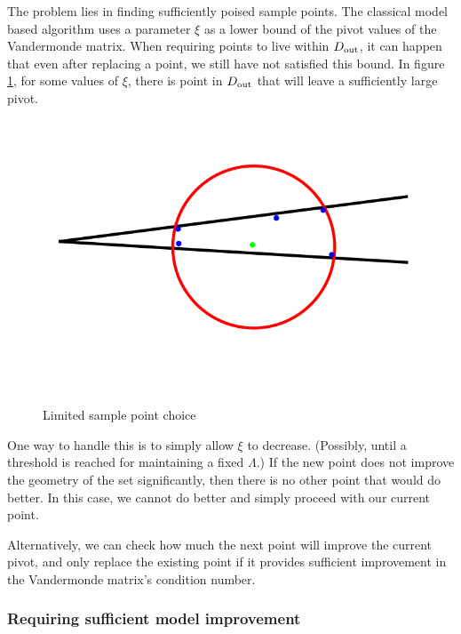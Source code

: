 The problem lies in finding sufficiently poised sample points.
The classical model based algorithm uses a parameter $\xi$ as a lower bound of the pivot values of the Vandermonde matrix.
When requiring points to live within $ D_{\text{out}} $, it can happen that even after replacing a point, we still have not satisfied this bound.
In figure \cref{lspc}, for some values of $\xi$, there is point in $ D_{\text{out}} $ that will leave a sufficiently large pivot.

\begin{figure}[h]
    \centering
    \includegraphics[scale=0.4]{images/bad_lambda.png}
    \caption{Limited sample point choice}
    \label{lspc}
\end{figure}


One way to handle this is to simply allow $\xi$ to decrease. (Possibly, until a threshold is reached for maintaining a fixed $\Lambda$.)
If the new point does not improve the geometry of the set significantly, then there is no other point that would do better.
In this case, we cannot do better and simply proceed with our current point.

Alternatively, we can check how much the next point will improve the current pivot, and only replace the existing point if it provides sufficient improvement in the Vandermonde matrix's condition number.



\subsubsection{Requiring sufficient model improvement}

